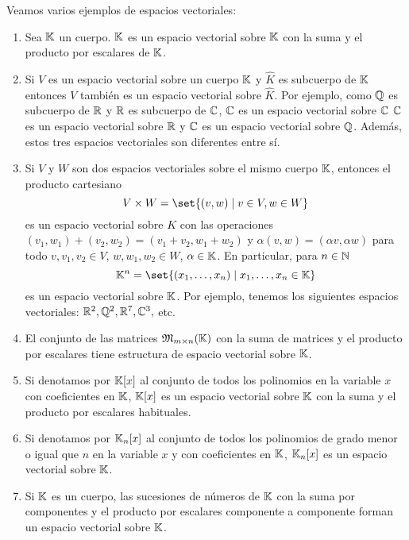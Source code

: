 \begin{example}
	Veamos varios ejemplos de espacios vectoriales:
	\begin{enumerate}
		\item Sea \(\mathbb{K} \) un cuerpo. \(\mathbb{K} \) es un espacio vectorial sobre \(\mathbb{K} \) con la suma y el producto por escalares de \(\mathbb{K} \).
		\item Si \(V \) es un espacio vectorial sobre un cuerpo \(\mathbb{K} \) y \(\hat{K }\) es subcuerpo de \(\mathbb{K} \) entonces \(V \) también es un espacio vectorial sobre \(\hat{K }\). Por ejemplo, como \(\mathbb{Q} \) es subcuerpo de \(\mathbb{R} \) y \(\mathbb{R} \) es subcuerpo de \(\mathbb{C} \), \(\mathbb{C} \) es un espacio vectorial sobre \(\mathbb{C} \) \(\mathbb{C} \) es un espacio vectorial sobre \(\mathbb{R} \) y \(\mathbb{C} \) es un espacio vectorial sobre \(\mathbb{Q} \). Además, estos tres espacios vectoriales son diferentes entre sí.
		\item Si \(V \) y \(W \) son dos espacios vectoriales sobre el mismo cuerpo \(\mathbb{K} \), entonces el producto cartesiano
		      \[
			      V \times W = \set{(v,w) \mid v \in V, w \in W }
		      \]
		      es un espacio vectorial sobre \(K \) con las operaciones \((v_1,w_1) + (v_2, w_2) = (v_1 + v_2, w_1 + w_2 )\) y \(\alpha (v,w) = (\alpha v , \alpha w)\) para todo \(v,v_1,v_2 \in V \), \(w, w_1, w_2 \in W \), \(\alpha \in \mathbb{K} \). En particular, para \(n \in \mathbb{N} \)
		      \[
			      \K^{n} = \set{(x_1, \ldots, x_n ) \mid x_1, \ldots, x_n \in \K }
		      \]
		      es un espacio vectorial sobre \(\mathbb{K} \). Por ejemplo, tenemos los siguientes espacios vectoriales: \(\mathbb{R}^{2}, \mathbb{Q}^{2}, \mathbb{R}^{7}, \mathbb{C}^{3},    \) etc.
		\item El conjunto de las matrices \(\mathfrak{\MakeUppercase{m}}_{m \times n}(\K )\) con la suma de matrices y el producto por escalares tiene estructura de espacio vectorial sobre \(\mathbb{K} \).
		\item Si denotamos por \(\mathbb{K}[x ]\) al conjunto de todos los polinomios en la variable \(x \) con coeficientes en \(\mathbb{K} \), \(\mathbb{K}[x ]\) es un espacio vectorial sobre \(\mathbb{K} \) con la suma y el producto por escalares habituales.
		\item Si denotamos por \(\mathbb{K}_n [x ]\) al conjunto de todos los polinomios de grado menor o igual que \(n \) en la variable \(x \) y con coeficientes en \(\mathbb{K} \), \(\mathbb{K}_n [x ]\) es un espacio vectorial sobre \(\mathbb{K} \).
		\item Si \(\mathbb{K} \) es un cuerpo, las sucesiones de números de \(\mathbb{K} \) con la suma por componentes y el producto por escalares componente a componente forman un espacio vectorial sobre \(\mathbb{K} \).
	\end{enumerate}
\end{example}
